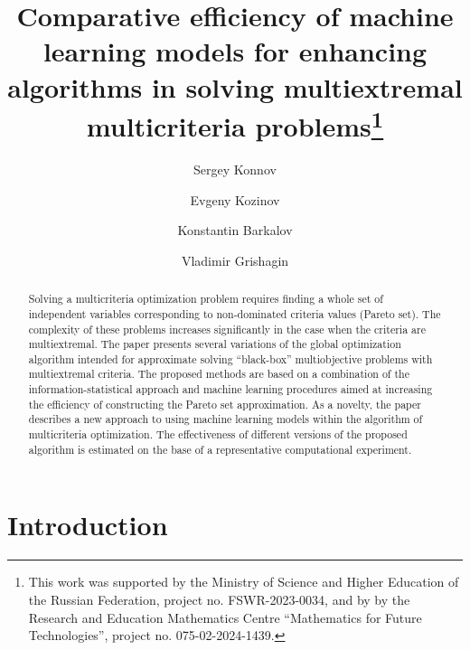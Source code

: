 \documentclass[runningheads]{llncs}
\begin{document}
%
\title{Comparative efficiency of machine learning models for enhancing algorithms in solving multiextremal multicriteria problems\thanks{This work was supported by the Ministry of Science and Higher Education of the Russian Federation, project no. FSWR-2023-0034, and by by the Research and Education Mathematics Centre ``Mathematics for Future Technologies'', project no. 075-02-2024-1439.} }
%
%
\author{Sergey Konnov \and
Evgeny Kozinov \Letter{} \and
Konstantin Barkalov  \and
Vladimir Grishagin}
%

%
\maketitle

%
\begin{abstract}
Solving a multicriteria optimization problem requires finding a whole set of independent variables corresponding to non-dominated criteria values (Pareto set). The complexity of these problems increases significantly in the case when the criteria are multiextremal. The paper presents several variations of the global optimization algorithm intended for approximate solving ``black-box'' multiobjective problems with multiextremal criteria. The proposed methods are based on a combination of the information-statistical approach and machine learning procedures aimed at increasing the efficiency of constructing the Pareto set approximation. As a novelty, the paper describes a new approach to using machine learning models within the algorithm of multicriteria optimization. The effectiveness of different versions of the proposed algorithm is estimated on the base of a representative computational experiment.

\end{abstract}
%
%
%
\section{Introduction}
\label{sec:1}
\end{document}
